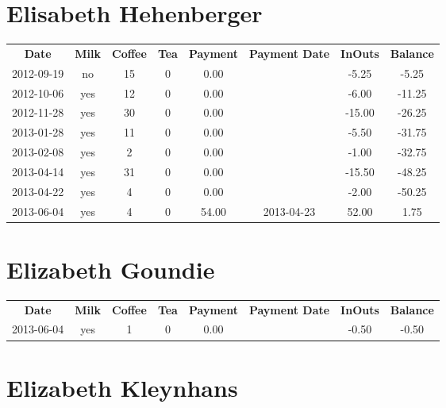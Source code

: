 \section{Elisabeth Hehenberger}

\begin{center}
\begin{tabular}{cccccccc}
\textbf{Date} & \textbf{Milk} & \textbf{Coffee} & \textbf{Tea} & \textbf{Payment} & \textbf{Payment Date} & \textbf{InOuts} & \textbf{Balance} \\
2012-09-19 & no & 15 & 0 &  0.00 &  &  -5.25 &  -5.25\\ 
2012-10-06 & yes & 12 & 0 &  0.00 &  &  -6.00 & -11.25\\ 
2012-11-28 & yes & 30 & 0 &  0.00 &  & -15.00 & -26.25\\ 
2013-01-28 & yes & 11 & 0 &  0.00 &  &  -5.50 & -31.75\\ 
2013-02-08 & yes &  2 & 0 &  0.00 &  &  -1.00 & -32.75\\ 
2013-04-14 & yes & 31 & 0 &  0.00 &  & -15.50 & -48.25\\ 
2013-04-22 & yes &  4 & 0 &  0.00 &  &  -2.00 & -50.25\\ 
2013-06-04 & yes &  4 & 0 & 54.00 & 2013-04-23 &  52.00 &   1.75
\end{tabular}
\end{center}

\section{Elizabeth Goundie}

\begin{center}
\begin{tabular}{cccccccc}
\textbf{Date} & \textbf{Milk} & \textbf{Coffee} & \textbf{Tea} & \textbf{Payment} & \textbf{Payment Date} & \textbf{InOuts} & \textbf{Balance} \\
2013-06-04 & yes & 1 & 0 & 0.00 &  & -0.50 & -0.50
\end{tabular}
\end{center}

\section{Elizabeth Kleynhans}


